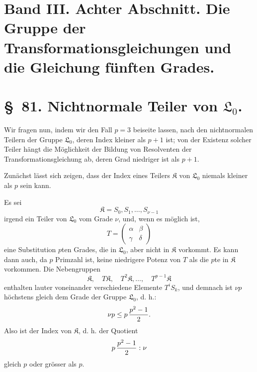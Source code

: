 \documentclass[11pt]{article}
\providecommand{\Lzero}{\mathfrak L_0}
\providecommand{\Kgrp}{\mathfrak K}
\begin{document}
\clearpage
\section*{Band III. Achter Abschnitt. Die Gruppe der Transformationsgleichungen und die Gleichung fünften Grades.}

\section*{\S~81. Nichtnormale Teiler von $\Lzero$.}

Wir fragen nun, indem wir den Fall $p=3$ beiseite lassen, nach den nichtnormalen Teilern der Gruppe $\Lzero$, deren Index kleiner als $p+1$ ist; von der Existenz solcher Teiler hängt die Möglichkeit der Bildung von Resolventen der Transformationsgleichung ab, deren Grad niedriger ist als $p+1$.

Zunächst lässt sich zeigen, dass der Index eines Teilers $\Kgrp$ von $\Lzero$ niemals kleiner als $p$ sein kann.

Es sei
\begin{equation}
 \Kgrp=S_0,S_1,\ldots,S_{\nu-1}
\tag{1}
\end{equation}
irgend ein Teiler von $\Lzero$ vom Grade $\nu$, und, wenn es möglich ist,
\begin{equation}
 T=\begin{pmatrix}\alpha&\beta\\ \gamma&\delta\end{pmatrix}
\tag{2}
\end{equation}
eine Substitution $p$ten Grades, die in $\Lzero$, aber nicht in $\Kgrp$ vorkommt. Es kann dann auch, da $p$ Primzahl ist, keine niedrigere Potenz von $T$ als die $p$te in $\Kgrp$ vorkommen. Die Nebengruppen
\begin{equation}
 \Kgrp,\quad T\Kgrp,\quad T^2\Kgrp,\ldots,\quad T^{p-1}\Kgrp
\tag{3}
\end{equation}
enthalten lauter voneinander verschiedene Elemente $T^iS_k$, und demnach ist $\nu p$ höchstens gleich dem Grade der Gruppe $\Lzero$, d. h.:
\[
 \nu p\leq p\,{p^2-1\over2}.
\]
Also ist der Index von $\Kgrp$, d. h. der Quotient
\[
 p\,{p^2-1\over2}:\nu
\]
gleich $p$ oder grösser als $p$.
\end{document}
